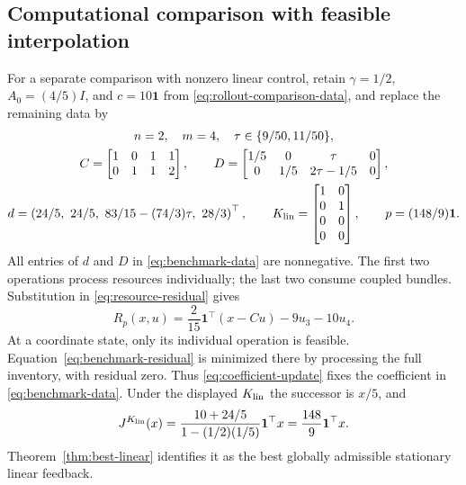 \documentclass[10pt]{article}
\newcommand{\one}{\mathbf 1}
\begin{document}
\subsection{Computational comparison with feasible interpolation}

For a separate comparison with nonzero linear control, retain $\gamma=1/2$, $A_0=(4/5)I$, and $c=10\one$ from \eqref{eq:rollout-comparison-data}, and replace the remaining data by
\begin{equation}
 \begin{gathered}
 n=2,\quad m=4,\quad \tau\in\{9/50,11/50\},\\
 C=\begin{bmatrix}1&0&1&1\\0&1&1&2\end{bmatrix},\qquad
 D=\begin{bmatrix}1/5&0&\tau&0\\0&1/5&2\tau-1/5&0\end{bmatrix},\\
 d=\left(24/5,\ 24/5,\ 83/15-(74/3)\tau,\ 28/3\right)^\top,\qquad
 K_{\rm lin}=\begin{bmatrix}1&0\\0&1\\0&0\\0&0\end{bmatrix},\qquad
 p=(148/9)\one.
 \end{gathered}
 \label{eq:benchmark-data}
\end{equation}
All entries of $d$ and $D$ in \eqref{eq:benchmark-data} are nonnegative. The first two operations process resources individually; the last two consume coupled bundles. Substitution in \eqref{eq:resource-residual} gives
\begin{equation}
 R_p(x,u)=\frac{2}{15}\one^\top(x-Cu)-9u_3-10u_4.
 \label{eq:benchmark-residual}
\end{equation}
At a coordinate state, only its individual operation is feasible. Equation~\eqref{eq:benchmark-residual} is minimized there by processing the full inventory, with residual zero. Thus \eqref{eq:coefficient-update} fixes the coefficient in \eqref{eq:benchmark-data}. Under the displayed $K_{\rm lin}$ the successor is $x/5$, and
\[
 J^{K_{\rm lin}}(x)=\frac{10+24/5}{1-(1/2)(1/5)}\one^\top x
 =\frac{148}{9}\one^\top x.
\]
Theorem~\ref{thm:best-linear} identifies it as the best globally admissible stationary linear feedback.
\end{document}

